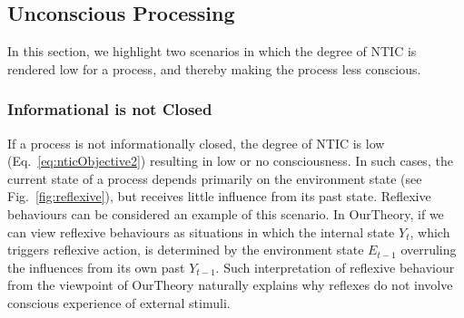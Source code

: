 \documentclass[utf8]{article}
\begin{document}
        
		
		
		
        \subsection{Unconscious Processing}
            In this section, we highlight two scenarios in which the degree of NTIC is rendered low for a process, and thereby making the process less conscious.
        
            \subsubsection*{Informational is not Closed}\label{sec:reflexive}
                If a process is not informationally closed, the degree of NTIC is low (Eq.~\ref{eq:nticObjective2}) resulting in low or no consciousness. In such cases, the current state of a process depends primarily on the environment state (see Fig.~\ref{fig:reflexive}), but receives little influence from its past state. Reflexive behaviours \citep{casali2013theoretically} can be considered an example of this scenario. In \ac{OurTheory}, if we can view reflexive behaviours as situations in which the internal state $Y_t$, which triggers reflexive action, is determined by the environment state $E_{t-1}$ overruling the influences from its own past $Y_{t-1}$.  Such interpretation of reflexive behaviour from the viewpoint of \ac{OurTheory} naturally explains why reflexes do not involve conscious experience of external stimuli. 
\end{document}
